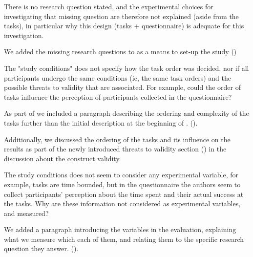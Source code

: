 \begin{remark}\label{rem:rqs}
There is no research question stated, and the experimental choices for investigating that missing question are therefore not explained (aside from the tasks), in particular why this design (tasks + questionnaire) is adequate for this investigation.
\end{remark}
\begin{solved}
We added the missing research questions to  as a means to set-up the study ()
\end{solved}

\begin{remark} \label{rem:study-conditions}
The "study conditions" does not specify how the task order was decided, nor if all participants undergo the same conditions (ie, the same task orders) and the possible threats to validity that are associated. For example, could the order of tasks influence the perception of participants collected in the questionnaire?
\end{remark}
\begin{solved}
As part of  we included a paragraph describing the ordering and complexity of the tasks further than the initial description at the beginning of . ().

Additionally, we discussed the ordering of the tasks and its influence on the results as part of the newly introduced threats to validity section () in the discussion about the construct validity.
\end{solved}

\begin{remark} \label{rem:study-variables}
The study conditions does not seem to consider any experimental variable, for example, tasks are time bounded, but in the questionnaire the authors seem to collect participants' perception about the time spent and their actual success at the tasks. Why are these information not considered as experimental variables, and measured?
\end{remark}
\begin{solved}
We added a paragraph introducing the variables in the evaluation, explaining what we measure which each of them, and relating them to the specific research question they answer. ().
\end{solved}

